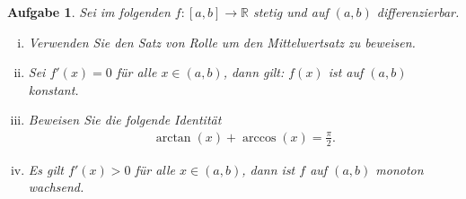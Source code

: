 \documentclass[a4paper, 20]{exam}
\newtheorem{ex}{Aufgabe}
\begin{document}
\begin{ex} Sei im folgenden $f:[a,b] \longrightarrow \mathbb{R}$ stetig und auf $(a,b)$ differenzierbar. 
\begin{enumerate}[i)]
\item Verwenden Sie den Satz von Rolle um den Mittelwertsatz zu beweisen.
\item Sei $f'(x)=0$ für alle $x \in (a,b)$, dann gilt: $f(x)$ ist auf $(a,b)$ konstant.
\item Beweisen Sie die folgende Identität 
\begin{align*}
\arctan(x) + \arccos(x) = \frac{\pi}{2}.
\end{align*}
\item Es gilt $f'(x) >0$ für alle $x \in (a,b)$, dann ist $f$ auf $(a,b)$ monoton wachsend. 
\end{enumerate}

\end{ex}
\end{document}
